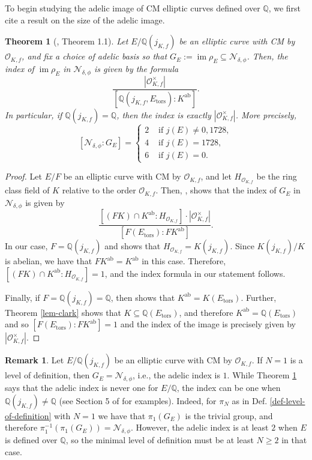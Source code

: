 \documentclass[11pt]{amsart}
\newtheorem{theorem}[defn]{Theorem}
\theoremstyle{definition}
\newtheorem{remark}[defn]{Remark}
\newcommand{\Q}{\mathbb{Q}}
\newcommand{\Of}{\mathcal{O}_{K,f}}
\DeclareMathOperator{\im}{im}  %
\begin{document}
To begin studying the adelic image of CM elliptic curves defined over $\Q$, we first cite a result on the size of the adelic image.


\begin{theorem}[\cite{CampagnaPengo2}, Theorem 1.1]\label{thm-adelic-indexQ}
    Let $E/\Q(j_{K,f})$ be an elliptic curve with CM by $\Of$, and fix a choice of adelic basis so that $G_{E} := \im \rho_{E} \subseteq \mathcal{N}_{\delta, \phi}$. Then, the index of $\im \rho_E$ in $\mathcal{N}_{\delta, \phi}$ is given by the formula
    $$\frac{|\Of^{\times}|}{[\Q(j_{K,f},E_\text{tors}):K^\text{ab}]}.$$
   In particular, if $\Q(j_{K,f})=\Q$, then the index is exactly $|\Of^{\times}|$. More precisely, 
    \[ [\mathcal{N}_{\delta, \phi} : G_E] = \begin{cases}
2 & \text{ if } j(E) \neq 0, 1728, \\
4 & \text{ if } j(E) = 1728, \\
6 & \text{ if } j(E) = 0.
\end{cases}  \]
\end{theorem}

\begin{proof} Let $E/F$ be an elliptic curve with CM by $\Of$, and let $H_{\Of}$ be the ring class field of $K$ relative to the order $\Of$. Then, \cite[Theorem 1.1]{CampagnaPengo2}, shows that the index of $G_E$ in $\mathcal{N}_{\delta, \phi}$ is given by
$$\frac{[(FK)\cap K^\text{ab} : H_{\Of}]\cdot |\Of^{\times}|}{[F(E_\text{tors}):FK^\text{ab}]}.$$
In our case, $F=\Q(j_{K,f})$ and \cite[Theorem 3.2]{lozano-galoiscm} shows that $H_{\Of}=K(j_{K,f})$. Since $K(j_{K,f})/K$ is abelian, we have that $FK^{\text{ab}} = K^\text{ab}$ in this case. Therefore, $[(FK)\cap K^\text{ab} : H_{\Of}]=1$, and the index formula in our statement follows.

Finally, if $F=\Q(j_{K,f})=\Q$, then \cite[Example 5.8]{silverman2} shows that $K^\text{ab} = K(E_\text{tors})$. Further, Theorem \ref{lem-clark} shows that $K\subseteq \Q(E_{\text{tors}})$, and therefore $K^\text{ab} = \Q(E_{\text{tors}})$ and so $[F(E_\text{tors}):FK^\text{ab}]=1$ and the index of the image is precisely given by $|\Of^{\times}|$.  
\end{proof}

\begin{remark}\label{rem-level1}
    Let $E/\Q(j_{K,f})$ be an elliptic curve with CM by $\Of$. If $N=1$ is a level of definition, then $G_E=\mathcal{N}_{\delta, \phi}$, i.e., the adelic index is $1$. While Theorem \ref{thm-adelic-indexQ} says that the adelic index is never one for $E/\Q$, the index can be one when $\Q(j_{K,f})\neq \Q$ (see Section 5 of \cite{CampagnaPengo2} for examples). Indeed, for $\pi_N$ as in Def. \ref{def-level-of-definition} with $N=1$ we have that $\pi_1(G_E)$ is the trivial group, and therefore $\pi_1^{-1}(\pi_1(G_E))=\mathcal{N}_{\delta, \phi}$. However, the adelic index is at least $2$ when $E$ is defined over $\Q$, so the minimal level of definition must be at least $N \geq 2$ in that case.
\end{remark}
\end{document}
